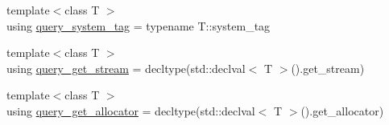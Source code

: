 \begin{DoxyCompactItemize}
\item 
{\footnotesize template$<$class T $>$ }\\using \hyperlink{namespacebc_1_1traits_acfa34d40f06d5122586d7adefdfeb42f}{query\+\_\+system\+\_\+tag} = typename T\+::system\+\_\+tag
\item 
{\footnotesize template$<$class T $>$ }\\using \hyperlink{namespacebc_1_1traits_ae56dfced2583c1fbec104bcbdc2f1b44}{query\+\_\+get\+\_\+stream} = decltype(std\+::declval$<$ T $>$().get\+\_\+stream)
\item 
{\footnotesize template$<$class T $>$ }\\using \hyperlink{namespacebc_1_1traits_a7843a6596fe24415ac9e5eb4d804726a}{query\+\_\+get\+\_\+allocator} = decltype(std\+::declval$<$ T $>$().get\+\_\+allocator)
\end{DoxyCompactItemize}
